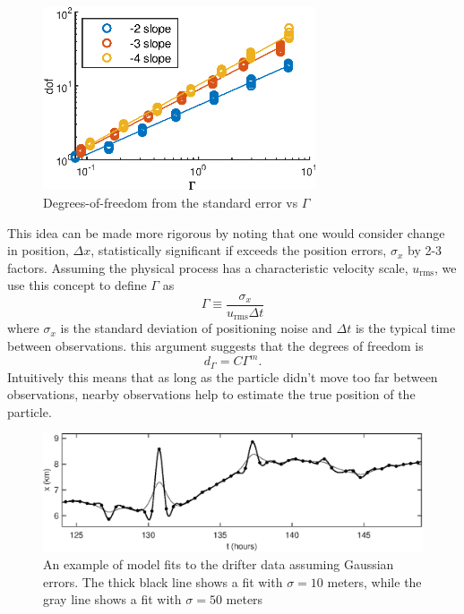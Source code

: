 \documentclass[10pt,journal]{IEEEtran}
\begin{document}
\begin{figure}
  \centerline{\includegraphics[width=19pc,angle=0]{figures/dofVsGamma}}
  
  \caption{Degrees-of-freedom from the standard error vs $\Gamma$}
  \label{dofVsGamma}
\end{figure}

This idea can be made more rigorous by noting that one would consider change in position, $\Delta x$, statistically significant if exceeds the position errors, $\sigma_x$ by 2-3 factors. Assuming the physical process has a characteristic velocity scale, $u_{\textrm{rms}}$, we use this concept to define $\Gamma$ as
\begin{equation}
\label{gamma_equation}
\Gamma \equiv \frac{\sigma_x}{u_{\textrm{rms}}\Delta t}
\end{equation}
where $\sigma_x$ is the standard deviation of positioning noise and $\Delta t$ is the typical time between observations. this argument suggests that the degrees of freedom is 
\begin{equation}
d_\Gamma = C \Gamma^m.
\end{equation}
Intuitively this means that as long as the particle didn't move too far between observations, nearby observations help to estimate the true position of the particle.

\begin{figure}[t]
  \centerline{\includegraphics[width=39pc,angle=0]{figures/gaussianfit}}
  
  \caption{An example of model fits to the drifter data assuming Gaussian errors. The thick black line shows a fit with $\sigma=10$ meters, while the gray line shows a fit with $\sigma=50$ meters}
  \label{gaussianfit}
\end{figure}
\end{document}
